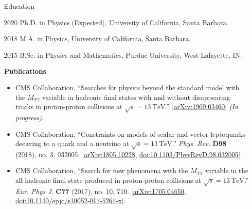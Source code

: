 \begin{vitae}

\begin{vitaesection}{Education}
\vspace{-0.1cm}
\item [2020] Ph.D. in Physics (Expected), University of California, Santa Barbara.
\item [2018] M.A. in Physics, University of California, Santa Barbara.
\item [2015] B.Sc. in Physics and Mathematics, Purdue University, West Lafayette, IN.
\end{vitaesection}

\vspace{0.5cm}
\textbf{Publications}


\begin{itemize}

\item CMS Collaboration, ``Searches for physics beyond the standard model with the $M_\mathrm{T2}$ variable in hadronic
  final states with and without disappearing tracks in proton-proton collisions at $\sqrt{s}=13~\mathrm{TeV}$.''
  [\href{https://arxiv.org/abs/1909.03460}{arXiv:1909.03460}] \textit{(In progress)}.

\item CMS Collaboration, ``Constraints on models of scalar and vector leptoquarks decaying to a quark
  and a neutrino at $\sqrt{s}=13~\mathrm{TeV}$.'' \textit{Phys. Rev.}
  \textbf{D98} (2018), no. 3, 032005. 
  [\href{https://arxiv.org/abs/1805.10228}{arXiv:1805.10228}, \href{https://doi.org/10.1103/PhysRevD.98.032005}{doi:10.1103/PhysRevD.98.032005}].

\item CMS Collaboration, ``Search for new phenomena with the $M_\mathrm{T2}$ variable in the all-hadronic
  final state produced in proton-proton collisions at $\sqrt{s}=13~\mathrm{TeV}$.'' \textit{Eur. Phys J.}
  \textbf{C77} (2017), no. 10, 710.
  [\href{https://arxiv.org/abs/1705.04650}{arXiv:1705.04650}, \href{https://doi.org/10.1140/epjc/s10052-017-5267-x}{doi:10.1140/epjc/s10052-017-5267-x}].


\end{itemize}
\end{vitae}
